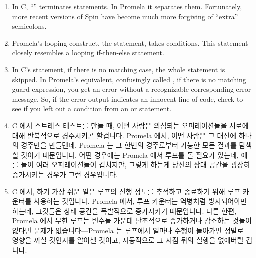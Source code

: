 \begin{enumerate}
\item	In C, ``\co{;}'' terminates statements.  In Promela it separates them.
	Fortunately, more recent versions of Spin have become
	much more forgiving of ``extra'' semicolons.
\item	Promela's looping construct, the  statement, takes
	conditions.
	This  statement closely resembles a looping if-then-else
	statement.
\item	In C's  statement, if there is no matching case, the whole
	statement is skipped.  In Promela's equivalent, confusingly called
	, if there is no matching guard expression, you get an error
	without a recognizable corresponding error message.
	So, if the error output indicates an innocent line of code,
	check to see if you left out a condition from an  or 
	statement.
\fi
\item	C 에서 스트레스 테스트를 만들 때, 어떤 사람은 의심되는 오퍼레이션들을
	서로에 대해 반복적으로 경주시키곤 할겁니다.
	Promela 에서, 어떤 사람은 그 대신에 하나의 경주만을 만들텐데, Promela
	는 그 한번의 경주로부터 가능한 모든 결과를 탐색할 것이기 때문입니다.
	어떤 경우에는 Promela 에서 루프를 돌 필요가 있는데, 예를 들어 여러
	오퍼레이션들이 겹치지만, 그렇게 하는게 당신의 상태 공간을 굉장히
	증가시키는 경우가 그런 경우입니다.
\item	C 에서, 하기 가장 쉬운 일은 루프의 진행 정도를 추적하고 종료하기 위해
	루프 카운터를 사용하는 것입니다.
	Promela 에서, 루프 카운터는 역병처럼 방지되어야만 하는데, 그것들은 상태
	공간을 폭발적으로 증가시키기 때문입니다.
	다른 한편, Promela 에서 무한 루프는 변수들 가운데 단조적으로
	증가하거나 감소하는 것들이 없다면 문제가 없습니다---Promela 는 루프에서
	얼마나 수행이 돌아가면 정말로 영향을 끼칠 것인지를 알아챌 것이고,
	자동적으로 그 지점 뒤의 실행을 없애버릴 겁니다.
\iffalse


\end{enumerate}
